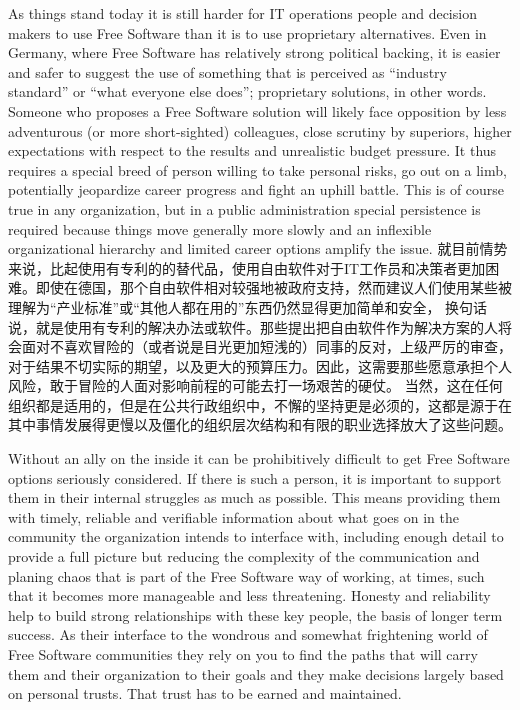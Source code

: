 As things stand today it is still harder for IT operations people and decision
makers to use Free Software than it is to use proprietary alternatives. Even in
Germany, where Free Software has relatively strong political backing, it is
easier and safer to suggest the use of something that is perceived as ``industry
standard'' or ``what everyone else does''; proprietary solutions, in other words.
Someone who proposes a Free Software solution will likely face opposition by
less adventurous (or more short-sighted) colleagues, close scrutiny by
superiors, higher expectations with respect to the results and unrealistic
budget pressure. It thus requires a special breed of person willing to take
personal risks, go out on a limb, potentially jeopardize career progress and
fight an uphill battle. This is of course true in any organization, but in a
public administration special persistence is required because things move
generally more slowly and an inflexible organizational hierarchy and limited
career options amplify the issue.
就目前情势来说，比起使用有专利的的替代品，使用自由软件对于IT工作员和决策者更加困难。即使在德国，那个自由软件相对较强地被政府支持，然而建议人们使用某些被理解为“产业标准”或“其他人都在用的”东西仍然显得更加简单和安全，
换句话说，就是使用有专利的解决办法或软件。那些提出把自由软件作为解决方案的人将会面对不喜欢冒险的（或者说是目光更加短浅的）同事的反对，上级严厉的审查，对于结果不切实际的期望，以及更大的预算压力。因此，这需要那些愿意承担个人风险，敢于冒险的人面对影响前程的可能去打一场艰苦的硬仗。
当然，这在任何组织都是适用的，但是在公共行政组织中，不懈的坚持更是必须的，这都是源于在其中事情发展得更慢以及僵化的组织层次结构和有限的职业选择放大了这些问题。

Without an ally on the inside it can be prohibitively difficult to get
Free Software options seriously considered. If there is such a person, it is important
to support them in their internal struggles as much as possible. This
means providing them with timely, reliable and verifiable information about
what goes on in the community the organization intends to interface with,
including enough detail to provide a full picture but reducing the
complexity of the communication and planing chaos that is part of the Free
Software way of working, at times, such that it becomes more manageable and
less threatening. Honesty and reliability help to build strong
relationships with these key people, the basis of longer term success. As
their interface to the wondrous and somewhat frightening world of Free
Software communities they rely on you to find the paths that will carry
them and their organization to their goals and they make decisions largely
based on personal trusts. That trust has to be earned and maintained.

